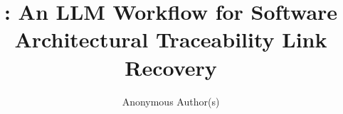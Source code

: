 \documentclass[acmsmall,screen,review,anonymous]{acmart}
\begin{document}

\renewcommand{\sectionautorefname}{Section}
\renewcommand{\subsectionautorefname}{Section}
\renewcommand{\subsubsectionautorefname}{Section}
\newcommand{\fone}{F\textsubscript{1}\xspace}
\newcommand{\ftwo}{F\textsubscript{2}\xspace}%
\newcommand{\avgftwo}{average \ftwo}
\newcommand{\avgfone}{average \fone}%
\newcommand{\cmrname}{component miss rate}
\newcommand{\cmr}{\ensuremath{\mathrm{CMR}}}

\title{\approach: An LLM Workflow for Software Architectural Traceability Link Recovery}

\author{Anonymous Author(s)}

\end{document}
